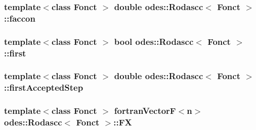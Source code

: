 \hypertarget{classodes_1_1Rodascc_a2fa24dd618ca55983c78c60175d632db}{
\subsubsection[{faccon}]{\setlength{\rightskip}{0pt plus 5cm}template$<$class Fonct $>$ double {\bf odes\-::\-Rodascc}$<$ Fonct $>$\-::faccon\hspace{0.3cm}{\ttfamily [private]}}}\label{classodes_1_1Rodascc_a2fa24dd618ca55983c78c60175d632db}
\hypertarget{classodes_1_1Rodascc_af6c320b771ac03d62d0cf80bea109006}{
\subsubsection[{first}]{\setlength{\rightskip}{0pt plus 5cm}template$<$class Fonct $>$ bool {\bf odes\-::\-Rodascc}$<$ Fonct $>$\-::first\hspace{0.3cm}{\ttfamily [private]}}}\label{classodes_1_1Rodascc_af6c320b771ac03d62d0cf80bea109006}
\hypertarget{classodes_1_1Rodascc_a1b8bb6987eead634886faadf09538bf8}{
\subsubsection[{first\-Accepted\-Step}]{\setlength{\rightskip}{0pt plus 5cm}template$<$class Fonct $>$ double {\bf odes\-::\-Rodascc}$<$ Fonct $>$\-::first\-Accepted\-Step\hspace{0.3cm}{\ttfamily [private]}}}\label{classodes_1_1Rodascc_a1b8bb6987eead634886faadf09538bf8}
\hypertarget{classodes_1_1Rodascc_abd4edcb40bf4b1dc38601c1d928e03ab}{
\subsubsection[{F\-X}]{\setlength{\rightskip}{0pt plus 5cm}template$<$class Fonct $>$ {\bf fortran\-Vector\-F}$<${\bf n}$>$ {\bf odes\-::\-Rodascc}$<$ Fonct $>$\-::F\-X\hspace{0.3cm}{\ttfamily [private]}}}\label{classodes_1_1Rodascc_abd4edcb40bf4b1dc38601c1d928e03ab}
